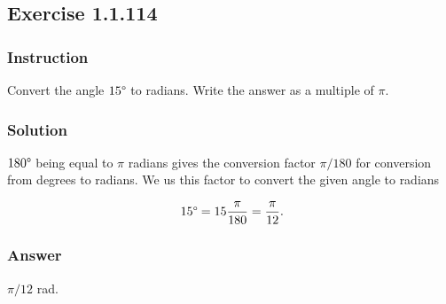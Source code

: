 \subsection*{Exercise 1.1.114}

\subsubsection*{Instruction}

Convert the angle $ 15 \degree $ to radians. Write the answer as a multiple of $ \pi $.

\subsubsection*{Solution}

$ 180 \degree $ being equal to $ \pi $ radians gives the conversion factor $ \pi / 180 $ for conversion from degrees to radians. We us this factor to convert the given angle to radians

\[ \phantom{.} 15 \degree = 15\frac{\pi}{180} =
\frac{\pi}{12} \text{.}\]

\subsubsection*{Answer}

$ \pi/12 $ rad.
